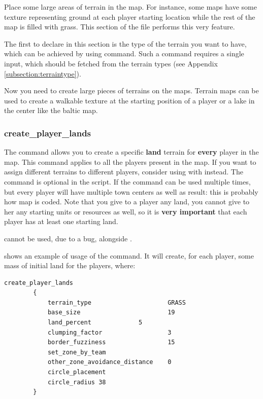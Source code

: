 \begin{appendices}
    Place some large areas of terrain in the map. For instance, some maps have some texture representing ground at each player starting location while the rest of the map is filled with grass. This section of the file performs this very feature.

    The first to declare in this section is the type of the terrain you want to have, which can be achieved by using  command. Such a command requires a single input, which should be fetched from the terrain types (see Appendix \ref{subsection:terraintype}).

    Now you need to create large pieces of terrains on the maps. Terrain maps can be used to create a walkable texture at the starting position of a player or a lake in the center like the baltic map\cite{zetnus:2015}.

    \subsubsection{create\_player\_lands}

    The command allows you to create a specific \textbf{land} terrain for \textbf{every} player in the map. This command applies to all the players present in the map. If you want to assign different terrains to different players, consider using  with  instead. The command is optional in the script. If the command can be used multiple times, but every player will have multiple town centers as well as result: this is probably how map  is coded. Note that you give to a player any land, you cannot give to her any starting units or resources as well, so it is \textbf{very important} that each player has at least one starting land.

    \begin{attention}
         cannot be used, due to a bug, alongside .
    \end{attention}

      shows an example of usage of the command. It will create, for each player, some mass of initial land for the players, where\cite{forgotten-empires:rms-features}:

    \begin{lstlisting}[language=rms,label={lst:create-land-player},caption={Example of usage of \term{create\_player\_lands} in Team Arean by vierklee.}]
        create_player_lands 
        { 
            terrain_type                     GRASS 
            base_size                        19
            land_percent			 5
            clumping_factor                  3
            border_fuzziness                 15
            set_zone_by_team
            other_zone_avoidance_distance    0
            circle_placement
            circle_radius 38
        }
    \end{lstlisting}


\end{appendices}
